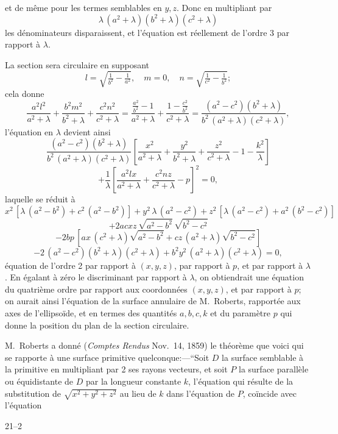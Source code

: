 \documentclass[11pt]{article}
\begin{document}
\medskip

\noindent et de même pour les termes semblables en $y, z$. Donc en multipliant par
\[
\lambda\,(a^2 + \lambda)(b^2 + \lambda)(c^2 + \lambda)
\]
les dénominateurs disparaissent, et l'équation est réellement de l'ordre 3 par rapport à $\lambda$.

La section sera circulaire en supposant
\[
l = \sqrt{\tfrac{1}{b^2} - \tfrac{1}{a^2}},\quad m = 0,\quad n = \sqrt{\tfrac{1}{c^2} - \tfrac{1}{b^2}};
\]
cela donne
\[
\frac{a^2l^2}{a^2 + \lambda} + \frac{b^2m^2}{b^2 + \lambda} + \frac{c^2n^2}{c^2 + \lambda} = \frac{\tfrac{a^2}{b^2} - 1}{a^2 + \lambda} + \frac{1 - \tfrac{c^2}{b^2}}{c^2 + \lambda} = \frac{(a^2 - c^2)(b^2 + \lambda)}{b^2\,(a^2 + \lambda)(c^2 + \lambda)},
\]
l'équation en $\lambda$ devient ainsi
\[
\frac{(a^2 - c^2)(b^2 + \lambda)}{b^2\,(a^2 + \lambda)(c^2 + \lambda)}\left[\frac{x^2}{a^2 + \lambda} + \frac{y^2}{b^2 + \lambda} + \frac{z^2}{c^2 + \lambda} - 1 - \frac{k^2}{\lambda}\right]
\]
\[
+ \frac{1}{\lambda}\left[\frac{a^2lx}{a^2 + \lambda} + \frac{c^2nz}{c^2 + \lambda} - p\right]^2 = 0,
\]
laquelle se réduit à
\[
x^2\,[\lambda\,(a^2 - b^2) + c^2\,(a^2 - b^2)] + y^2\,\lambda\,(a^2 - c^2) + z^2\,[\lambda\,(a^2 - c^2) + a^2\,(b^2 - c^2)]
\]
\[
+ 2acxz\,\sqrt{a^2 - b^2}\,\sqrt{b^2 - c^2}
\]
\[
- 2bp\,[ax\,(c^2 + \lambda)\sqrt{a^2 - b^2} + cz\,(a^2 + \lambda)\sqrt{b^2 - c^2}]
\]
\[
- 2\,(a^2 - c^2)(b^2 + \lambda)(c^2 + \lambda) + b^2y^2\,(a^2 + \lambda)(c^2 + \lambda) = 0,
\]
équation de l'ordre 2 par rapport à $(x, y, z)$, par rapport à $p$, et par rapport à $\lambda$. En égalant à zéro le discriminant par rapport à $\lambda$, on obtiendrait une équation du quatrième ordre par rapport aux coordonnées $(x, y, z)$, et par rapport à $p$; on aurait ainsi l'équation de la surface annulaire de M.~Roberts, rapportée aux axes de l'ellipsoïde, et en termes des quantités $a, b, c, k$ et du paramètre $p$ qui donne la position du plan de la section circulaire.

M.~Roberts a donné (\textit{Comptes Rendus} Nov.~14, 1859) le théorème que voici qui se rapporte à une surface primitive quelconque:---``Soit $D$ la surface semblable à la primitive en multipliant par 2 ses rayons vecteurs, et soit $P$ la surface parallèle ou équidistante de $D$ par la longueur constante $k$, l'équation qui résulte de la substitution de $\sqrt{x^2 + y^2 + z^2}$ au lieu de $k$ dans l'équation de $P$, coïncide avec l'équation

\hfill 21--2

\newpage
\end{document}
